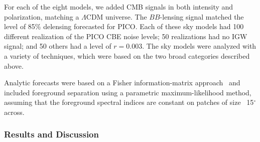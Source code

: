 \documentclass[PICOReport.tex]{subfiles}
\begin{document}
For each of the eight models, we added CMB signals in both intensity and polarization, matching a $\Lambda$CDM universe. The $BB$-lensing signal matched the level of 85\% delensing forecasted for PICO. Each of these sky models had 100 different realization of the PICO CBE noise levels; 50 realizations had no \ac{IGW} signal; and 50 others had a level of $r=0.003$. 
The sky models were analyzed with a variety of techniques, which were based on the two broad categories described above. 

Analytic forecasts were based on a Fisher information-matrix approach~\citep{errard_feeney_2016} and included foreground separation
using a parametric maximum-likelihood method, assuming that the foreground spectral indices are constant on patches of size ~15$^{\circ}$ across. 



\subsubsection{Results and Discussion}
\end{document}
